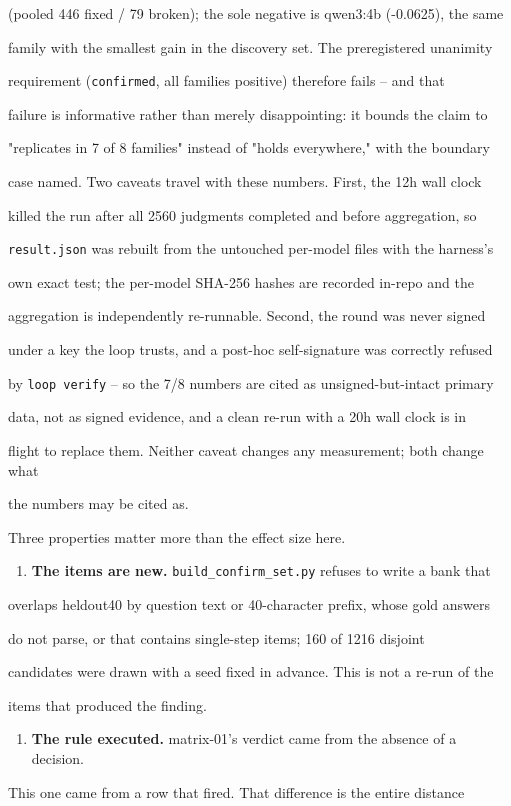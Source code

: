 \documentclass[11pt]{article}
\begin{document}
(pooled 446 fixed / 79 broken); the sole negative is qwen3:4b (-0.0625), the same

family with the smallest gain in the discovery set. The preregistered unanimity

requirement (\texttt{confirmed}, all families positive) therefore fails -- and that

failure is informative rather than merely disappointing: it bounds the claim to

"replicates in 7 of 8 families" instead of "holds everywhere," with the boundary

case named. Two caveats travel with these numbers. First, the 12h wall clock

killed the run after all 2560 judgments completed and before aggregation, so

\texttt{result.json} was rebuilt from the untouched per-model files with the harness's

own exact test; the per-model SHA-256 hashes are recorded in-repo and the

aggregation is independently re-runnable. Second, the round was never signed

under a key the loop trusts, and a post-hoc self-signature was correctly refused

by \texttt{loop verify} -- so the 7/8 numbers are cited as unsigned-but-intact primary

data, not as signed evidence, and a clean re-run with a 20h wall clock is in

flight to replace them. Neither caveat changes any measurement; both change what

the numbers may be cited as.


Three properties matter more than the effect size here.


\begin{enumerate}\item {\bf The items are new.} \texttt{build\_confirm\_set.py} refuses to write a bank that
\end{enumerate}
overlaps heldout40 by question text or 40-character prefix, whose gold answers

do not parse, or that contains single-step items; 160 of 1216 disjoint

candidates were drawn with a seed fixed in advance. This is not a re-run of the

items that produced the finding.

\begin{enumerate}\item {\bf The rule executed.} matrix-01's verdict came from the absence of a decision.
\end{enumerate}
This one came from a row that fired. That difference is the entire distance
\end{document}
